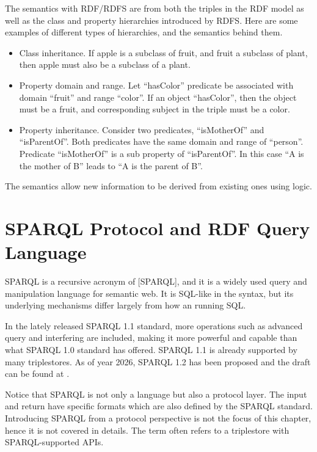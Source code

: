 The semantics with RDF/RDFS are from both the triples in the RDF model as well as the class and property hierarchies introduced by RDFS. Here are some examples of different types of hierarchies, and the semantics behind them.
\begin{itemize}
	\item Class inheritance. If apple is a subclass of fruit, and fruit a subclass of plant, then apple must also be a subclass of a plant.
	\item Property domain and range. Let ``hasColor'' predicate be associated with domain ``fruit'' and range ``color''. If an object ``hasColor'', then the object must be a fruit, and corresponding subject in the triple must be a color.
	\item Property inheritance. Consider two predicates, ``isMotherOf'' and ``isParentOf''. Both predicates have the same domain and range of ``person''. Predicate ``isMotherOf'' is a sub property of ``isParentOf''. In this case ``A is the mother of B'' leads to ``A is the parent of B''.
\end{itemize}

The semantics allow new information to be derived from existing ones using logic.

\section{SPARQL Protocol and RDF Query Language} \label{sec:sparql}

SPARQL is a recursive acronym of [SPARQL], and it is a widely used query and manipulation language for semantic web. It is SQL-like in the syntax, but its underlying mechanisms differ largely from how an  running SQL.

In the lately released SPARQL 1.1 standard, more operations such as advanced query and interfering are included, making it more powerful and capable than what SPARQL 1.0 standard has offered. SPARQL 1.1 is already supported by many triplestores. As of year 2026, SPARQL 1.2 has been proposed and the draft can be found at \cite{w3c2026sparql12query}.

Notice that SPARQL is not only a language but also a protocol layer. The input and return have specific formats which are also defined by the SPARQL standard. Introducing SPARQL from a protocol perspective is not the focus of this chapter, hence it is not covered in details. The term  often refers to a triplestore with SPARQL-supported APIs.

